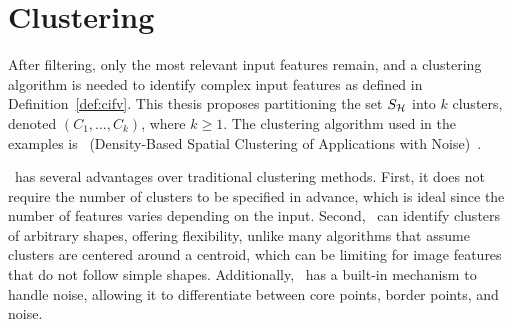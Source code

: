     
    
    
    
    

\section{Clustering}
\label{sec:clustering}

After filtering, only the most relevant input features remain, and a clustering algorithm is needed to identify complex input features as defined in Definition~\ref{def:cifv}. This thesis proposes partitioning the set \( S_{\mathcal{H}} \) into \( k \) clusters, denoted \( (C_1, \dots, C_k) \), where \( k \geq 1 \). The clustering algorithm used in the examples is \DBSCAN\ (Density-Based Spatial Clustering of Applications with Noise)~\cite{EsterKSX96}.

\DBSCAN\ has several advantages over traditional clustering methods. First, it does not require the number of clusters to be specified in advance, which is ideal since the number of features varies depending on the input. Second, \DBSCAN\ can identify clusters of arbitrary shapes, offering flexibility, unlike many algorithms that assume clusters are centered around a centroid, which can be limiting for image features that do not follow simple shapes. Additionally, \DBSCAN\ has a built-in mechanism to handle noise, allowing it to differentiate between core points, border points, and noise.

